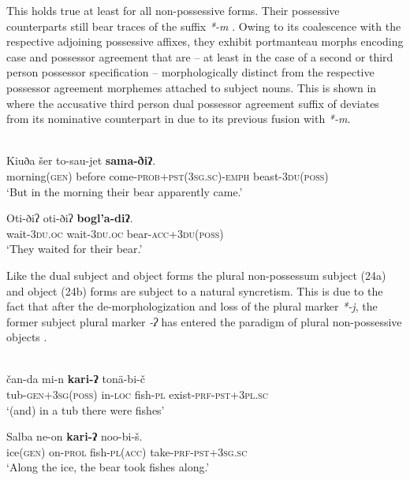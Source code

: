 \documentclass[output=paper]{LSP/langsci}
\begin{document}
This holds true at least for all non-possessive forms. Their possessive counterparts still bear traces of the suffix \textit{*-m} \citep[242]{Mikola1988Geschichte}. Owing to its coalescence with  the respective adjoining possessive affixes, they exhibit portmanteau morphs encoding case and possessor agreement that are -- at least in the case of a second or third person possessor specification -- morphologically distinct from the respective possessor agreement morphemes attached to subject nouns. This is shown in  where the accusative third person dual possessor agreement suffix of  deviates from its nominative counterpart in  due to its previous fusion with \textit{*-m}. 

\ea %
\label{12-wr-ex:23}
\\
\ea\label{12-wr-ex:23a}
\gll  Kiuða šer to-sau-jet \textbf{sama-ðiʔ}.\\
morning(\textsc{gen)} before come-\textsc{prob+pst(3sg.sc)-emph} beast-\textsc{3du(poss)}\\
\glt ‘But in the morning their bear apparently came.’%

\ex \label{12-wr-ex:23b}
\gll  Oti-ðiʔ oti-ðiʔ \textbf{bogl’a-diʔ}.\\
wait-\textsc{3du.oc} wait-\textsc{3du.oc} bear-\textsc{acc+3du(poss)}\\
\glt  ‘They waited for their bear.’
\z
\z

Like the dual subject and object forms the plural non-possessum subject (\cf 24a) and object (\cf 24b) forms are subject to a natural syncretism. This is due to the fact that after the de-morphologization and  loss of the plural marker \textit{*-j}, the former subject plural marker \textit{-ʔ} has entered the paradigm of plural non-possessive objects \citep[238]{Mikola1988Geschichte}. 

\ea\label{12-wr-ex:24}
\\
\ea \label{12-wr-ex:24a}
\gll  čan-da mi-n \textbf{ kari-ʔ} tonä-bi-č\\
 tub-\textsc{gen+3sg(poss)} in-\textsc{loc} fish-\textsc{pl} exist\textsc{-prf-pst+3pl.sc}\\
\glt  ‘(and) in a tub there were fishes’

\ex \label{12-wr-ex:24b}
\gll  Salba ne-on \textbf{kari-ʔ} noo-bi-š.\\
 ice\textsc{(gen)} on-\textsc{prol} fish-\textsc{pl(acc)} take-\textsc{prf-pst+3sg.sc}\\
\glt ‘Along the ice, the bear took fishes along.’
\z
\z
\end{document}
